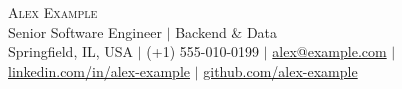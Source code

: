 \documentclass[11pt,letterpaper]{article}
\begin{document}
\begin{center}
  {\Huge\scshape\color{accent} Alex Example} \\[2pt]
  \normalsize Senior Software Engineer $|$ Backend \& Data \\[2pt]
  \small
  Springfield, IL, USA
  \hspace{1pt} $|$ \hspace{1pt}
  (+1) 555-010-0199
  \hspace{1pt} $|$ \hspace{1pt}
  \href{mailto:alex@example.com}{alex@example.com}
  \hspace{1pt} $|$ \hspace{1pt}
  \href{https://linkedin.com/in/alex-example}{linkedin.com/in/alex-example}
  \hspace{1pt} $|$ \hspace{1pt}
  \href{https://github.com/alex-example}{github.com/alex-example}
\end{center}

\end{document}
